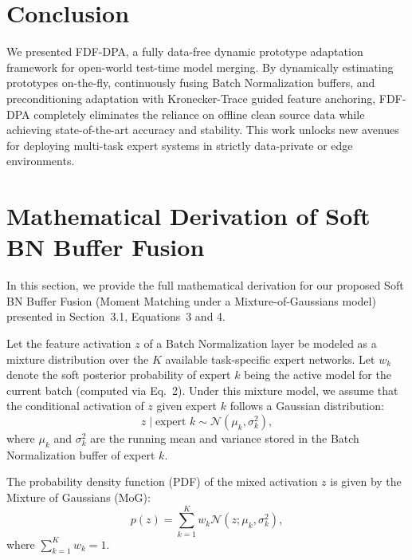 \documentclass{article}
\theoremstyle{plain}
\theoremstyle{definition}
\theoremstyle{remark}
\begin{document}
\section{Conclusion}
\label{sec:conclusion}
We presented FDF-DPA, a fully data-free dynamic prototype adaptation framework for open-world test-time model merging. By dynamically estimating prototypes on-the-fly, continuously fusing Batch Normalization buffers, and preconditioning adaptation with Kronecker-Trace guided feature anchoring, FDF-DPA completely eliminates the reliance on offline clean source data while achieving state-of-the-art accuracy and stability. This work unlocks new avenues for deploying multi-task expert systems in strictly data-private or edge environments.

\clearpage



\newpage
\appendix
\onecolumn

\section{Mathematical Derivation of Soft BN Buffer Fusion}
\label{app:bn_fusion_derivation}

In this section, we provide the full mathematical derivation for our proposed Soft BN Buffer Fusion (Moment Matching under a Mixture-of-Gaussians model) presented in Section~3.1, Equations~3 and 4.

Let the feature activation $z$ of a Batch Normalization layer be modeled as a mixture distribution over the $K$ available task-specific expert networks. Let $w_k$ denote the soft posterior probability of expert $k$ being the active model for the current batch (computed via Eq.~2).
Under this mixture model, we assume that the conditional activation of $z$ given expert $k$ follows a Gaussian distribution:
\begin{equation}
z \mid \text{expert } k \sim \mathcal{N}(\mu_k, \sigma_k^2),
\end{equation}
where $\mu_k$ and $\sigma_k^2$ are the running mean and variance stored in the Batch Normalization buffer of expert $k$.

The probability density function (PDF) of the mixed activation $z$ is given by the Mixture of Gaussians (MoG):
\begin{equation}
p(z) = \sum_{k=1}^K w_k \mathcal{N}(z; \mu_k, \sigma_k^2),
\end{equation}
where $\sum_{k=1}^K w_k = 1$.
\end{document}
